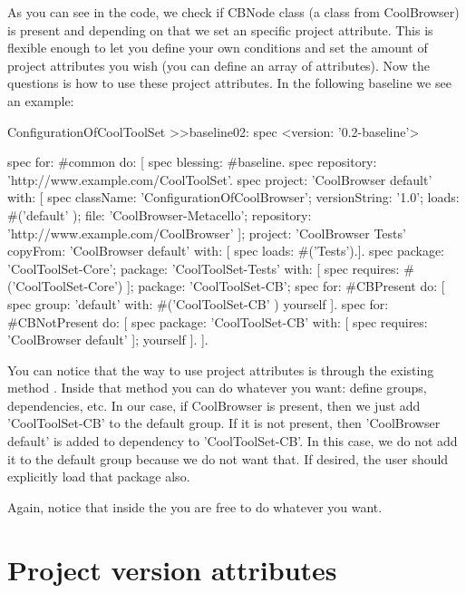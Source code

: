 \documentclass[a4paper,10pt,twoside]{book}
\begin{document}
\begin{code}{}
\begin{code}{}
As you can see in the code, we check if CBNode class (a class from CoolBrowser) is present and depending on that we set an specific project attribute.
This is flexible enough to let you define your own conditions and set the amount of project attributes you wish (you can define an array of attributes).  
Now the questions is how to use these project attributes. In the following baseline we see an example:

\begin{code}{}
ConfigurationOfCoolToolSet >>baseline02: spec 
	<version: '0.2-baseline'>
	
	spec for: #common do: [
		spec blessing: #baseline.
		spec repository: 'http://www.example.com/CoolToolSet'.
		spec project: 'CoolBrowser default' with: [
				spec
					className: 'ConfigurationOfCoolBrowser';
					versionString: '1.0';
					loads: #('default' );
					file: 'CoolBrowser-Metacello';
					repository: 'http://www.example.com/CoolBrowser' ];
			project: 'CoolBrowser Tests' 
				copyFrom: 'CoolBrowser default' 
				with: [ spec loads: #('Tests').].
		spec 
			package: 'CoolToolSet-Core';
			package: 'CoolToolSet-Tests' with: [ 
				spec requires: #('CoolToolSet-Core') ];
			package: 'CoolToolSet-CB';			
		spec for: #CBPresent do: [
			spec
				group: 'default' with: #('CoolToolSet-CB' )
				yourself ].
		spec for: #CBNotPresent do: [
			spec 
				package: 'CoolToolSet-CB' with: [ spec requires: 'CoolBrowser default' ];
				yourself ].
			].
		
\end{code}

You can notice that the way to use project attributes is through the existing method . Inside that method you can do whatever you want: define groups, dependencies, etc. In our case, if CoolBrowser is present, then we just add 'CoolToolSet-CB' to the default group. If it is not present, then 'CoolBrowser default' is added to dependency to 'CoolToolSet-CB'. In this case, we do not add it to the default group because we do not want that. If desired, the user should explicitly load that package also. 

Again, notice that inside the  you are free to do whatever you want.

\section{Project version attributes}
 
 

\end{code}
\end{code}
\end{document}
